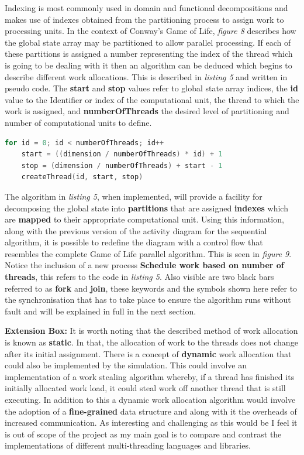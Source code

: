 \documentclass[11pt]{article} %
\begin{document}
Indexing is most commonly used in domain and functional decompositions and makes use of indexes obtained from the partitioning process to assign work to processing units. In the context of Conway's Game of Life, {\it figure 8} describes how the global state array may be partitioned to allow parallel processing. If each of these partitions is assigned a number representing the index of the thread which is going to be dealing with it then an algorithm can be deduced which begins to describe different work allocations. This is described in {\it listing 5} and written in pseudo code. The {\bf start} and {\bf stop} values refer to global state array indices, the {\bf id} value to the Identifier or index of the computational unit, the thread to which the work is assigned, and {\bf numberOfThreads} the desired level of partitioning and number of computational units to define.
\begin{lstlisting}[language=C, caption={Pseudo Domain Decomposition and Thread Mapping Algorithm}]
for id = 0; id < numberOfThreads; id++
    start = ((dimension / numberOfThreads) * id) + 1
    stop = (dimension / numberOfThreads) + start - 1
    createThread(id, start, stop)
\end{lstlisting}
The algorithm in {\it listing 5}, when implemented, will provide a facility for decomposing the global state into {\bf partitions} that are assigned {\bf indexes} which are {\bf mapped} to their appropriate computational unit. Using this information, along with the previous version of the activity diagram for the sequential algorithm, it is possible to redefine the diagram with a control flow that resembles the complete Game of Life parallel algorithm. This is seen in {\it figure 9}. Notice the inclusion of a new process {\bf Schedule work based on number of threads}, this refers to the code in {\it listing 5}. Also visible are two black bars referred to as {\bf fork} and {\bf join}, these keywords and the symbols shown here refer to the synchronisation that has to take place to ensure the algorithm runs without fault and will be explained in full in the next section.
\smallskip
\begin{mdframed}
{\bf Extension Box:} It is worth noting that the described method of work allocation is known as {\bf static}. In that, the allocation of work to the threads does not change after its initial assignment. There is a concept of {\bf dynamic} work allocation that could also be implemented by the simulation. This could involve an implementation of a work stealing algorithm whereby, if a thread has finished its initially allocated work load, it could steal work off another thread that is still executing. In addition to this a dynamic work allocation algorithm would involve the adoption of a {\bf fine-grained} data structure and along with it the overheads of increased communication. As interesting and challenging as this would be I feel it is out of scope of the project as my main goal is to compare and contrast the implementations of different multi-threading languages and libraries.
\end{mdframed}
\end{document}
